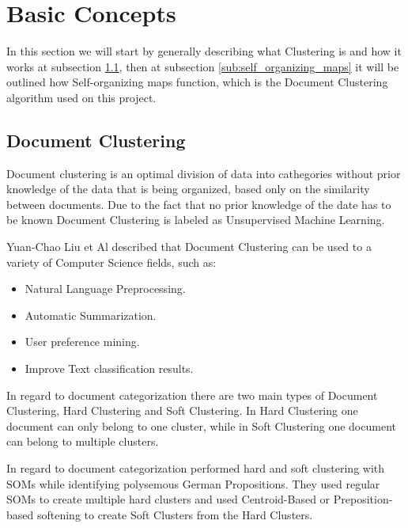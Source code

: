 \section{Basic Concepts} %
\label{sec:basic_concepts}
In this section we will start by generally describing what Clustering is and how it works at subsection \ref{sub:clustering}, then at subsection \ref{sub:self_organizing_maps} it will be outlined how Self-organizing \cite{Kohonen1990}maps function, which is the Document Clustering algorithm used on this project.


\subsection{Document Clustering} %
\label{sub:clustering}
Document clustering is an optimal division of data into cathegories without prior knowledge of the data that is being organized, based only on the similarity between documents. Due to the fact that no prior knowledge of the date has to be known Document Clustering is labeled as Unsupervised Machine Learning.

Yuan-Chao Liu et Al \cite{Liu2012b} described that Document Clustering can be used to a variety of Computer Science fields, such as:
\begin{itemize}
  \item Natural Language Preprocessing.
  \item Automatic Summarization.
  \item User preference mining.
  \item Improve Text classification results.
\end{itemize}

In regard to document categorization there are two main types of Document Clustering, Hard Clustering and Soft Clustering. In Hard Clustering one document can only belong to one cluster, while in Soft Clustering one document can belong to multiple clusters. 

In regard to document categorization \citet{Springorum1998} performed hard and soft clustering with SOMs \citep{Kohonen1990} while identifying polysemous German Propositions. They used regular SOMs to create multiple hard clusters and used Centroid-Based or Preposition-based softening to create Soft Clusters from the Hard Clusters.

